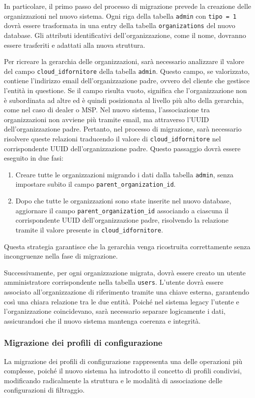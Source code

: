 In particolare, il primo passo del processo di migrazione prevede la creazione delle organizzazioni nel nuovo sistema. Ogni riga della tabella \texttt{admin} con \texttt{tipo = 1} dovrà essere trasformata in una entry della tabella \texttt{organizations} del nuovo database. Gli attributi identificativi dell’organizzazione, come il nome, dovranno essere trasferiti e adattati alla nuova struttura.

Per ricreare la gerarchia delle organizzazioni, sarà necessario analizzare il valore del campo \texttt{cloud\_idfornitore} della tabella \texttt{admin}. Questo campo, se valorizzato, contiene l’indirizzo email dell’organizzazione padre, ovvero del cliente che gestisce l’entità in questione. Se il campo risulta vuoto, significa che l'organizzazione non è subordinata ad altre ed è quindi posizionata al livello più alto della gerarchia, come nel caso di dealer o MSP.
%
Nel nuovo sistema, l'associazione tra organizzazioni non avviene più tramite email, ma attraverso l'UUID dell'organizzazione padre. Pertanto, nel processo di migrazione, sarà necessario risolvere queste relazioni traducendo il valore di \texttt{cloud\_idfornitore} nel corrispondente UUID dell'organizzazione padre. Questo passaggio dovrà essere eseguito in due fasi:
\begin{enumerate}
  \item Creare tutte le organizzazioni migrando i dati dalla tabella \texttt{admin}, senza impostare subito il campo \texttt{parent\_organization\_id}.
  \item Dopo che tutte le organizzazioni sono state inserite nel nuovo database, aggiornare il campo \texttt{parent\_organization\_id} associando a ciascuna il corrispondente UUID dell'organizzazione padre, risolvendo la relazione tramite il valore presente in \texttt{cloud\_idfornitore}.
\end{enumerate}
Questa strategia garantisce che la gerarchia venga ricostruita correttamente senza incongruenze nella fase di migrazione.

Successivamente, per ogni organizzazione migrata, dovrà essere creato un utente amministratore corrispondente nella tabella \texttt{users}. L’utente dovrà essere associato all’organizzazione di riferimento tramite una chiave esterna, garantendo così una chiara relazione tra le due entità. Poiché nel sistema legacy l'utente e l'organizzazione coincidevano, sarà necessario separare logicamente i dati, assicurandosi che il nuovo sistema mantenga coerenza e integrità.

\subsubsection{Migrazione dei profili di configurazione}
La migrazione dei profili di configurazione rappresenta una delle operazioni più complesse, poiché il nuovo sistema ha introdotto il concetto di profili condivisi, modificando radicalmente la struttura e le modalità di associazione delle configurazioni di filtraggio.

